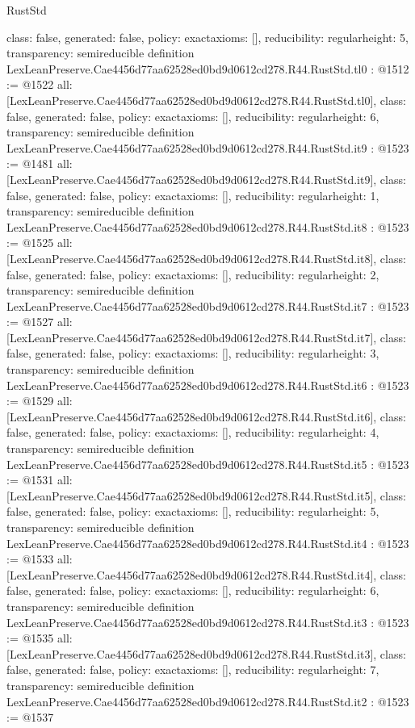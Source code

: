 \begin{lexlean}{RustStd}
\begin{coremodule}
{  class: false,
  generated: false,
  policy: exact{axioms: []},
  reducibility: regular{height: 5},
  transparency: semireducible
}
definition LexLeanPreserve.Cae4456d77aa62528ed0bd9d0612cd278.R44.RustStd.tl0 : @1512 := @1522 {
  all: [LexLeanPreserve.Cae4456d77aa62528ed0bd9d0612cd278.R44.RustStd.tl0],
  class: false,
  generated: false,
  policy: exact{axioms: []},
  reducibility: regular{height: 6},
  transparency: semireducible
}
definition LexLeanPreserve.Cae4456d77aa62528ed0bd9d0612cd278.R44.RustStd.it9 : @1523 := @1481 {
  all: [LexLeanPreserve.Cae4456d77aa62528ed0bd9d0612cd278.R44.RustStd.it9],
  class: false,
  generated: false,
  policy: exact{axioms: []},
  reducibility: regular{height: 1},
  transparency: semireducible
}
definition LexLeanPreserve.Cae4456d77aa62528ed0bd9d0612cd278.R44.RustStd.it8 : @1523 := @1525 {
  all: [LexLeanPreserve.Cae4456d77aa62528ed0bd9d0612cd278.R44.RustStd.it8],
  class: false,
  generated: false,
  policy: exact{axioms: []},
  reducibility: regular{height: 2},
  transparency: semireducible
}
definition LexLeanPreserve.Cae4456d77aa62528ed0bd9d0612cd278.R44.RustStd.it7 : @1523 := @1527 {
  all: [LexLeanPreserve.Cae4456d77aa62528ed0bd9d0612cd278.R44.RustStd.it7],
  class: false,
  generated: false,
  policy: exact{axioms: []},
  reducibility: regular{height: 3},
  transparency: semireducible
}
definition LexLeanPreserve.Cae4456d77aa62528ed0bd9d0612cd278.R44.RustStd.it6 : @1523 := @1529 {
  all: [LexLeanPreserve.Cae4456d77aa62528ed0bd9d0612cd278.R44.RustStd.it6],
  class: false,
  generated: false,
  policy: exact{axioms: []},
  reducibility: regular{height: 4},
  transparency: semireducible
}
definition LexLeanPreserve.Cae4456d77aa62528ed0bd9d0612cd278.R44.RustStd.it5 : @1523 := @1531 {
  all: [LexLeanPreserve.Cae4456d77aa62528ed0bd9d0612cd278.R44.RustStd.it5],
  class: false,
  generated: false,
  policy: exact{axioms: []},
  reducibility: regular{height: 5},
  transparency: semireducible
}
definition LexLeanPreserve.Cae4456d77aa62528ed0bd9d0612cd278.R44.RustStd.it4 : @1523 := @1533 {
  all: [LexLeanPreserve.Cae4456d77aa62528ed0bd9d0612cd278.R44.RustStd.it4],
  class: false,
  generated: false,
  policy: exact{axioms: []},
  reducibility: regular{height: 6},
  transparency: semireducible
}
definition LexLeanPreserve.Cae4456d77aa62528ed0bd9d0612cd278.R44.RustStd.it3 : @1523 := @1535 {
  all: [LexLeanPreserve.Cae4456d77aa62528ed0bd9d0612cd278.R44.RustStd.it3],
  class: false,
  generated: false,
  policy: exact{axioms: []},
  reducibility: regular{height: 7},
  transparency: semireducible
}
definition LexLeanPreserve.Cae4456d77aa62528ed0bd9d0612cd278.R44.RustStd.it2 : @1523 := @1537 {
}
\end{coremodule}
\end{lexlean}
